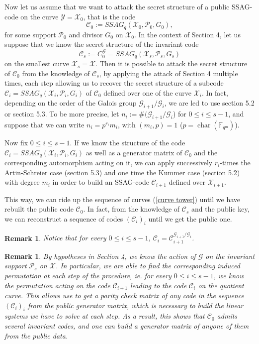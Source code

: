 \documentclass[10pt]{article}
\newtheorem{rq1}[thm]{Remark}
\newcommand{\s}{\vspace{0.3cm}}
\newcommand{\C}{\mathcal{C}}
\newcommand{\fqm}{\mathbb{F}_{q^m}}
\newcommand{\X}{\mathcal{X}}
\newcommand{\Y}{\mathcal{Y}}
\newcommand{\PR}{\mathcal{P}}
\newcommand{\G}{\mathcal{G}}
\begin{document}
Now let us assume that we want to attack the secret structure of a public SSAG-code on the curve $\Y=\X_0$, that is the code 
\[\C_0 := SSAG_q(\X_0,\PR_0,G_0),\]
for some support $\PR_0$ and divisor $G_0$ on $\X_0$. In the context of Section 4, let us suppose that we know the secret structure of the invariant code 
\[\C_s:= C_0^{\G} = SSAG_q(\X_s,\PR_s,G_s)\]
on the smallest curve $\X_s=\X$. Then it is possible to attack the secret structure of $\C_0$ from the knowledge of $\C_s$, by applying the attack of Section 4 multiple times, each step allowing us to recover the secret structure of a subcode $\C_i=SSAG_q(\X_i,\PR_i,G_i)$ of $\C_0$ defined over one of the curve $\X_i$. In fact, depending on the order of the Galois group $\G_{i+1}/\G_i$, we are led to use section 5.2 or section 5.3. 
To be more precise, let $n_i:= \#(\G_{i+1}/\G_i$) for $0 \leq i \leq s-1$, and suppose that we can write $n_i = p^{r_i}m_i$, with $(m_i,p)=1$ ($p=\operatorname{char}(\fqm)$). 
\s

Now fix $0 \leq i \leq s-1$. If we know the structure of the code $\C_i = SSAG_q(\X_i,\PR_i,G_i)$ as well as a generator matrix of $\C_0$ and the corresponding automorphism acting on it, we can apply successively $r_i$-times the Artin-Schreier case (section 5.3) and one time the Kummer case (section 5.2) with degree $m_i$ in order to build an SSAG-code $\C_{i+1}$ defined over $\X_{i+1}$. 

This way, we can ride up the sequence of curves (\ref{curve tower}) until we have rebuilt the public code $\C_0$. In fact, from the knowledge of $\C_s$ and the public key, we can reconstruct a sequence of codes $(\C_i)_i$ until we get the public one. 

\s

\begin{rq1} \rm
Notice that for every $0 \leq i \leq s-1$, $\C_i = \C_{i+1}^{\G_{i+1}/\G_i}$. 
\end{rq1}


\begin{rq1} \rm \label{induced permutation} By hypotheses in Section 4, we know the action of $\G$ on the invariant support $\PR_s$ on $\X$. In particular, we are able to find the corresponding induced permutation at each step of the procedure, ie. for every $0 \leq i \leq s-1$, we know the permutation acting on the code $\C_{i+1}$ leading to the code $\C_i$ on the quotient curve. This allows use to get a parity check matrix of any code in the sequence $(\C_i)_i$ from the public generator matrix, which is necessary to build the linear systems we have to solve at each step. As a result, this shows that $\C_0$ admits several invariant codes, and one can build a generator matrix of anyone of them from the public data.
\end{rq1}
\end{document}

